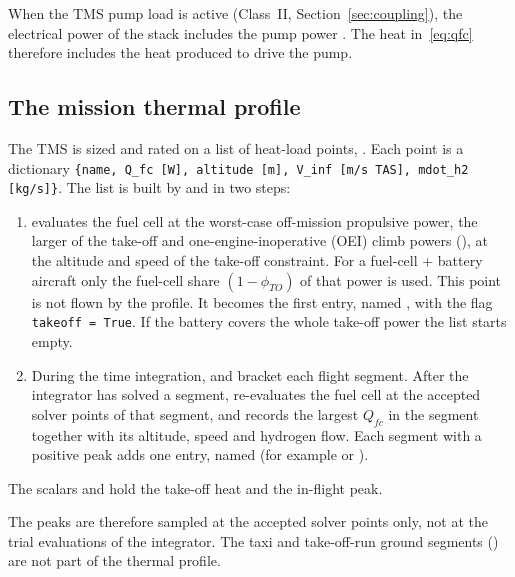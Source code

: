 \documentclass[a4paper,11pt]{article}
\newcommand{\Qfc}{Q_{fc}}
\begin{document}
When the TMS pump load is active (Class~II, Section~\ref{sec:coupling}), the electrical
power of the stack includes the pump power . The heat in~\eqref{eq:qfc}
therefore includes the heat produced to drive the pump.

\subsection{The mission thermal profile}\label{sec:profile}
The TMS is sized and rated on a list of heat-load points, .
Each point is a dictionary \texttt{\{name, Q\_fc [W], altitude [m], V\_inf [m/s TAS], mdot\_h2 [kg/s]\}}. The list is built by  and
 in two steps:
\begin{enumerate}
\item {} evaluates the fuel cell at the worst-case
  off-mission propulsive power, the larger of the take-off and one-engine-inoperative
  (OEI) climb powers (), at the altitude and
  speed of the take-off constraint. For a fuel-cell + battery aircraft only the fuel-cell
  share $(1-\phi_{TO})$ of that power is used. This point is not flown by the profile. It
  becomes the first entry, named , with the flag \texttt{takeoff = True}. If
  the battery covers the whole take-off power the list starts empty.
\item During the time integration,  and
   bracket each flight segment. After the integrator has solved a
  segment,  re-evaluates the fuel cell at the accepted
  solver points of that segment, and  records the largest $\Qfc$
  in the segment together with its altitude, speed and hydrogen flow. Each
  segment with a positive peak adds one entry, named  (for
  example  or ).
\end{enumerate}
The scalars  and  hold the
take-off heat and the in-flight peak.

The peaks are therefore sampled at the accepted solver points only, not at the trial
evaluations of the integrator. The taxi and take-off-run ground segments () are not part of the
thermal profile.
\end{document}
